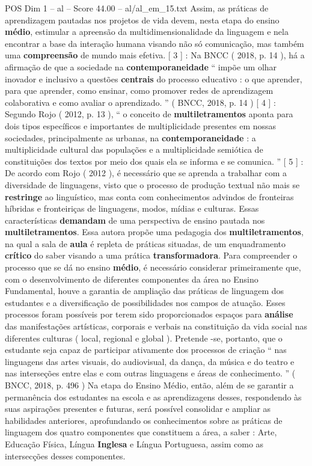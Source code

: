\begin{textsample}{POS Dim 1 – al – Score 44.00 – al/al\_em\_15.txt}
Assim, as práticas de aprendizagem pautadas nos projetos de vida devem, nesta etapa do ensino \textbf{médio}, estimular a apreensão da multidimensionalidade da linguagem e nela encontrar a base da interação humana visando não só comunicação, mas também uma \textbf{compreensão} de mundo mais efetiva. [ 3 ] : Na BNCC ( 2018, p. 14 ), há a afirmação de que a sociedade na \textbf{contemporaneidade} “ impõe um olhar inovador e inclusivo a questões \textbf{centrais} do processo educativo : o que aprender, para que aprender, como ensinar, como promover redes de aprendizagem colaborativa e como avaliar o aprendizado. ” ( BNCC, 2018, p. 14 ) [ 4 ] : Segundo Rojo ( 2012, p. 13 ), “ o conceito de \textbf{multiletramentos} aponta para dois tipos específicos e importantes de multiplicidade presentes em nossas sociedades, principalmente as urbanas, na \textbf{contemporaneidade} : a multiplicidade cultural das populações e a multiplicidade semiótica de constituições dos textos por meio dos quais ela se informa e se comunica. ” [ 5 ] : De acordo com Rojo ( 2012 ), é necessário que se aprenda a trabalhar com a diversidade de linguagens, visto que o processo de produção textual não mais se \textbf{restringe} ao linguístico, mas conta com conhecimentos advindos de fronteiras híbridas e fronteiriças de linguagens, modos, mídias e culturas.
Essas características \textbf{demandam} de uma perspectiva de ensino pautada nos \textbf{multiletramentos}.
Essa autora propõe uma pedagogia dos \textbf{multiletramentos}, na qual a sala de \textbf{aula} é repleta de práticas situadas, de um enquadramento \textbf{crítico} do saber visando a uma prática \textbf{transformadora}.
Para compreender o processo que se dá no ensino \textbf{médio}, é necessário considerar primeiramente que, com o desenvolvimento de diferentes componentes da área no Ensino Fundamental, houve a garantia de ampliação das práticas de linguagem dos estudantes e a diversificação de possibilidades nos campos de atuação.
Esses processos foram possíveis por terem sido proporcionados espaços para \textbf{análise} das manifestações artísticas, corporais e verbais na constituição da vida social nas diferentes culturas ( local, regional e global ).
Pretende -se, portanto, que o estudante seja capaz de participar ativamente dos processos de criação “ nas linguagens das artes visuais, do audiovisual, da dança, da música e do teatro e nas interseções entre elas e com outras linguagens e áreas de conhecimento. ” ( BNCC, 2018, p. 496 ) Na etapa do Ensino Médio, então, além de se garantir a permanência dos estudantes na escola e as aprendizagens desses, respondendo às suas aspirações presentes e futuras, será possível consolidar e ampliar as habilidades anteriores, aprofundando os conhecimentos sobre as práticas de linguagem dos quatro componentes que constituem a área, a saber : Arte, Educação Física, Língua \textbf{Inglesa} e Língua Portuguesa, assim como as intersecções desses componentes.

\end{textsample}

